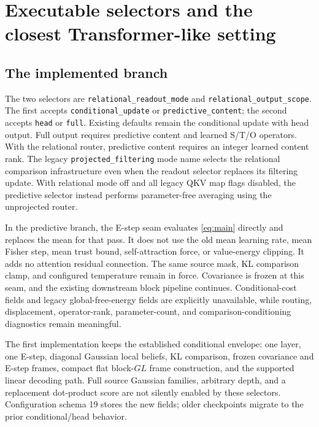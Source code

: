\documentclass[11pt,letterpaper]{article}
\begin{document}
\section{Executable selectors and the closest Transformer-like setting}
\subsection{The implemented branch}
The two selectors are \texttt{relational\_readout\_mode} and \texttt{relational\_output\_scope}. The first accepts \texttt{conditional\_update} or \texttt{predictive\_content}; the second accepts \texttt{head} or \texttt{full}. Existing defaults remain the conditional update with head output. Full output requires predictive content and learned S/T/O operators. With the relational router, predictive content requires an integer learned content rank. The legacy \texttt{projected\_filtering} mode name selects the relational comparison infrastructure even when the readout selector replaces its filtering update. With relational mode off and all legacy QKV map flags disabled, the predictive selector instead performs parameter-free averaging using the unprojected router.

In the predictive branch, the E-step seam evaluates \eqref{eq:main} directly and replaces the mean for that pass. It does not use the old mean learning rate, mean Fisher step, mean trust bound, self-attraction force, or value-energy clipping. It adds no attention residual connection. The same source mask, KL comparison clamp, and configured temperature remain in force. Covariance is frozen at this seam, and the existing downstream block pipeline continues. Conditional-cost fields and legacy global-free-energy fields are explicitly unavailable, while routing, displacement, operator-rank, parameter-count, and comparison-conditioning diagnostics remain meaningful.

The first implementation keeps the established conditional envelope: one layer, one E-step, diagonal Gaussian local beliefs, KL comparison, frozen covariance and E-step frames, compact flat block-$GL$ frame construction, and the supported linear decoding path. Full source Gaussian families, arbitrary depth, and a replacement dot-product score are not silently enabled by these selectors. Configuration schema 19 stores the new fields; older checkpoints migrate to the prior conditional/head behavior.
\end{document}
